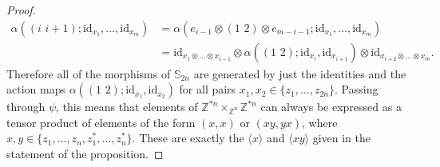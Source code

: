\documentclass{amsbook} %
\newcommand{\id}{\textrm{id}}
\newcommand{\trans}[2]{( #1 \, \, #2 )}
\numberwithin{section}{chapter}
\begin{document}
\begin{proof}
\begin{align*}
  	\alpha(\trans{i}{i+1} ; \id_{x_1}, \ldots, \id_{x_m} ) &= \alpha(e_{i-1} \otimes \trans{1}{2} \otimes e_{m-i-1};  \id_{x_1}, \ldots, \id_{x_m} ) \\
  	& =\id_{x_1 \otimes \ldots \otimes x_{i-1}} \otimes \alpha(\trans{1}{2};\id_{x_i}, \id_{x_{i+1}}) \otimes \id_{x_{i+2} \otimes \ldots \otimes x_m}.
  \end{align*}
Therefore all of the morphisms of $\mathbb{S}_{2n}$ are generated by just the identities and the action maps $\alpha(\trans{1}{2};\id_{x_1}, \id_{x_2})$ for all pairs $x_1, x_2 \in \{z_1, \ldots, z_{2n} \}$. Passing through $\psi$, this means that elements of $\mathbb{Z}^{\ast n} \times_{\mathbb{Z}^n} \mathbb{Z}^{\ast n}$ can always be expressed as a tensor product of elements of the form $(x, x)$ or $(x y, y x)$, where $x, y \in \{z_1, \ldots, z_n, z_1^*, \ldots, z_n^* \}$. These are exactly the $\langle x \rangle$ and $\langle xy \rangle$ given in the statement of the proposition.


\end{proof}
\end{document}
